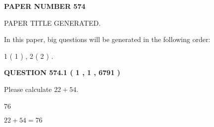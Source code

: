 \documentclass[12pt]{article}
\begin{document}
   
   
   
\newpage 
\setcounter{page}{ 
   574001 } 
   
   
   
   
 {\textbf{ \Large{ PAPER NUMBER  574  }}}
   
   
\vspace{0.2in}
   
   
   
   
   
   
   
   
 \vspace{0.2in}
 
 
 
 
   
   
 PAPER TITLE GENERATED.
   
   
   
\vspace{0.2in}
   
In this paper, big questions will be generated in the following order: 
   
   
   1 ( 1 )
 ,
   2 ( 2 )
 .
  
\vspace{0.2in}
  
{\textbf{\Large{QUESTION
574.1 
 ( 1 , 1 , 6791 )
}}}
  
  
 
Please calculate $ %
22 +  %
54 $.
 
 
 
\noindent{}
 
 

76
 
 
\noindent{}
 
 

 
 
 
\noindent{}
 
 

$ %
22 +  %
54=   %
76$
 
 
\noindent{}
 
 

 
   
   
   
\end{document}
